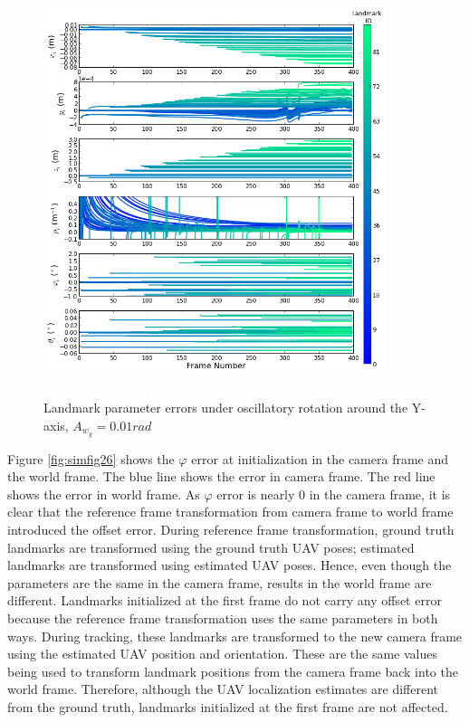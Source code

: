 \begin{figure}[h]
  \centering
  \includegraphics[width=10cm, height=12cm]{./Figures/SimulationFigures/Figure2500.png}
  \caption{Landmark parameter errors under
    oscillatory rotation around the Y-axis, $A_{w_y}=0.01rad$}
  \label{fig:simfig25}
\end{figure}
\FloatBarrier

Figure \ref{fig:simfig26} shows the $\varphi$ error at initialization
in the camera frame and the world frame. The blue line shows the error in
camera frame. The red line shows the error in world frame. As
$\varphi$ error is nearly 0 in the camera frame, it is clear that the
reference frame transformation from camera frame to world frame
introduced the offset error. During reference frame transformation,
ground truth landmarks are transformed using the ground truth UAV
poses; estimated landmarks are transformed using estimated UAV poses.
Hence, even though the parameters are the same in the camera frame,
results in the world frame are different. Landmarks initialized at the
first frame do not carry any offset error because the reference frame
transformation uses the same parameters in both ways. During
tracking, these landmarks are transformed to the new camera frame
using the estimated UAV position and orientation. These are the same
values being used to transform landmark positions from the camera frame
back into the world frame. Therefore, although the UAV localization
estimates are different from the ground truth, landmarks initialized
at the first frame are not affected.

